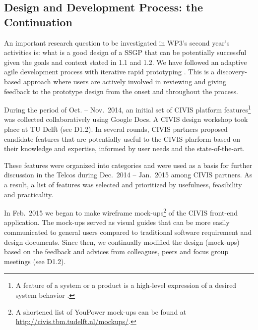 %
%
%

\subsection{Design and Development Process: the Continuation}

An important research question to be investigated in WP3's second year's activities is: what is a good design of a SSGP that can be potentially successful given the goals and context stated in 1.1 and 1.2. 
% 
We have followed an adaptive agile development process with iterative rapid prototyping \citep{Leffingwell2011}. This is a discovery-based approach where users are actively involved in reviewing and giving feedback to the prototype design from the onset and throughout the process. 

During the period of Oct. -- Nov.~2014, an initial set of CIVIS platform features\footnote{A feature of a system or a product is a high-level expression of a desired system behavior \citep{Leffingwell2000}. } was collected collaboratively using Google Docs. A CIVIS design workshop took place at TU Delft (see D1.2). In several rounds, CIVIS partners proposed candidate features that are potentially useful to the CIVIS plarform based on their knowledge and expertise, informed by user needs and the state-of-the-art.
%

These features were organized into categories and were used as a basis for further discussion in the Telcos during Dec.~2014 -- Jan.~2015 among CIVIS partners. 
As a result, a list of features was selected and prioritized by usefulness, feasibility and practicality. 

In Feb.~2015 we began to make wireframe mock-ups\footnote{A shortened list of YouPower mock-ups can be found at \url{http://civis.tbm.tudelft.nl/mockups/}.} of the CIVIS front-end application. The mock-ups served as visual guides that can be more easily communicated to general users compared to traditional software requirement and design documents. Since then, we continually modified the design (mock-ups) based on the feedback and advices from colleagues, peers and focus group meetings (see D1.2). 


